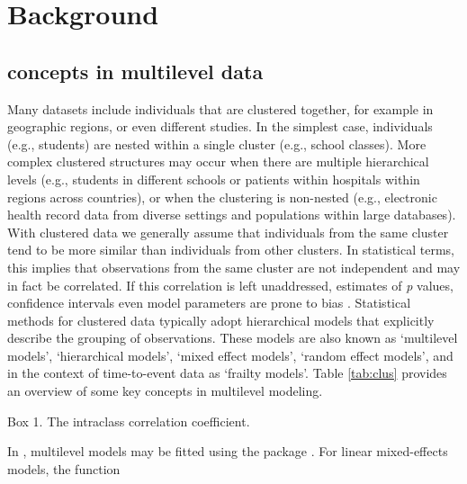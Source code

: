 \documentclass[
  article]{jss}
\begin{document}
\hypertarget{sec-models}{%
\section{Background}\label{sec-models}}

\hypertarget{concepts-in-multilevel-data}{%
\subsection{concepts in multilevel
data}\label{concepts-in-multilevel-data}}

Many datasets include individuals that are clustered together, for
example in geographic regions, or even different studies. In the
simplest case, individuals (e.g., students) are nested within a single
cluster (e.g., school classes). More complex clustered structures may
occur when there are multiple hierarchical levels (e.g., students in
different schools or patients within hospitals within regions across
countries), or when the clustering is non-nested (e.g., electronic
health record data from diverse settings and populations within large
databases). With clustered data we generally assume that individuals
from the same cluster tend to be more similar than individuals from
other clusters. In statistical terms, this implies that observations
from the same cluster are not independent and may in fact be correlated.
If this correlation is left unaddressed, estimates of \emph{p} values,
confidence intervals even model parameters are prone to bias
\citep{loca01}. Statistical methods for clustered data typically adopt
hierarchical models that explicitly describe the grouping of
observations. These models are also known as `multilevel models',
`hierarchical models', `mixed effect models', `random effect models',
and in the context of time-to-event data as `frailty models'. Table
\ref{tab:clus} provides an overview of some key concepts in multilevel
modeling.

\begin{tcolorbox}[enhanced jigsaw, bottomrule=.15mm, breakable, toprule=.15mm, rightrule=.15mm, arc=.35mm, left=2mm, leftrule=.75mm, colback=white, opacityback=0]

Box 1. The intraclass correlation coefficient.

\end{tcolorbox}

In , multilevel models may be fitted using the package
. For linear mixed-effects models, the function
\end{document}
